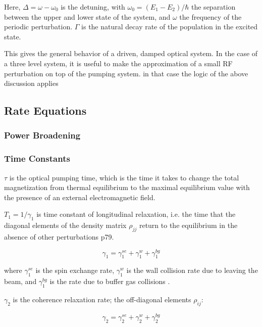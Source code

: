 Here, $\Delta = \omega - \omega_0$ is the detuning, with $\omega_0 =
(E_1 - E_2)/\hbar$ the separation between the upper and lower state of
the system, and $\omega$ the frequency of the periodic
perturbation. $\Gamma$ is the natural decay rate of the population in
the excited state.

This gives the general behavior of a driven, damped optical system. In
the case of a three level system, it is useful to make the
approximation of a small RF perturbation on top of the pumping
system. in that case the logic of the above discussion applies


\subsection{Rate Equations}

\subsubsection{Power Broadening}

\subsubsection{Time Constants}\label{timeconstants}

$\tau$ is the optical pumping time, which is the time it takes to
change the total magnetization from thermal equilibrium to the maximal
equilibrium value with the presence of an external electromagnetic
field.

$T_1 = 1/\gamma_1$ is time constant of longitudinal relaxation,
i.e. the time that the diagonal elements of the density matrix
$\rho_{jj}$ return to the equilibrium in the absence of other
perturbations \cite{vanier} p79.

\begin{equation}
\gamma_1 = \gamma_1^{se} + \gamma_1^{w} + \gamma_1^{bg} 
\label{eqn:gamma1}
\end{equation}

where $\gamma_1^{se}$ is the spin exchange rate, $\gamma_1^{w}$ is the
wall collision rate due to leaving the beam, and $\gamma_1^{bg}$ is
the rate due to buffer gas collisions \cite{vanier}.

$\gamma_2$ is the coherence relaxation rate; the off-diagonal elements
$\rho_{ij}$:

\begin{equation}
\gamma_2 = \gamma_2^{se} + \gamma_2^{w} + \gamma_2^{bg}
\label{eqn:gamma2}
\end{equation}

